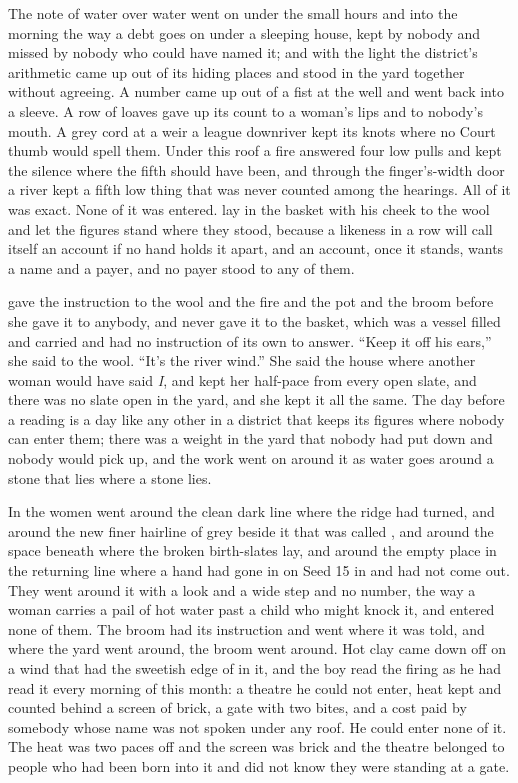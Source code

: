 
The note of water over water went on under the small hours and into the morning the way a debt goes on under a sleeping house, kept by nobody and missed by nobody who could have named it; and with the light the district's arithmetic came up out of its hiding places and stood in the yard together without agreeing. A number came up out of a fist at the well and went back into a sleeve. A row of loaves gave up its count to a woman's lips and to nobody's mouth. A grey cord at a weir a league downriver kept its knots where no Court thumb would spell them. Under this roof a fire answered four low pulls and kept the silence where the fifth should have been, and through the finger's-width door a river kept a fifth low thing that was never counted among the hearings. All of it was exact. None of it was entered.  lay in the basket with his cheek to the wool and let the figures stand where they stood, because a likeness in a row will call itself an account if no hand holds it apart, and an account, once it stands, wants a name and a payer, and no payer stood to any of them.

 gave the instruction to the wool and the fire and the pot and the broom before she gave it to anybody, and never gave it to the basket, which was a vessel filled and carried and had no instruction of its own to answer. “Keep it off his ears,” she said to the wool. “It's the river wind.” She said the house where another woman would have said \emph{I}, and kept her half-pace from every open slate, and there was no slate open in the yard, and she kept it all the same. The day before a reading is a day like any other in a district that keeps its figures where nobody can enter them; there was a weight in the yard that nobody had put down and nobody would pick up, and the work went on around it as water goes around a stone that lies where a stone lies.

In  the women went around the clean dark line where the  ridge had turned, and around the new finer hairline of grey beside it that was called , and around the space beneath  where the broken birth-slates lay, and around the empty place in the returning line where a hand had gone in on Seed 15 in  and had not come out. They went around it with a look and a wide step and no number, the way a woman carries a pail of hot water past a child who might knock it, and entered none of them. The broom had its instruction and went where it was told, and where the yard went around, the broom went around. Hot clay came down off  on a wind that had the sweetish edge of  in it, and the boy read the firing as he had read it every morning of this month: a theatre he could not enter, heat kept and counted behind a screen of brick, a gate with two bites, and a cost paid by somebody whose name was not spoken under any roof. He could enter none of it. The heat was two paces off and the screen was brick and the theatre belonged to people who had been born into it and did not know they were standing at a gate.

